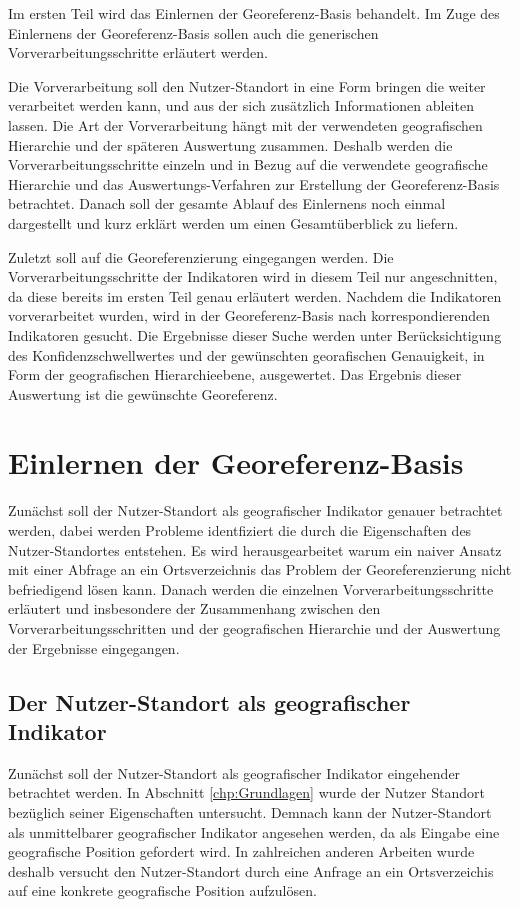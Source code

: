 	Im ersten Teil wird das Einlernen der Georeferenz-Basis behandelt.
	Im Zuge des Einlernens der Georeferenz-Basis sollen auch die generischen Vorverarbeitungsschritte erläutert werden.

	Die Vorverarbeitung soll den Nutzer-Standort in eine Form bringen die weiter verarbeitet werden kann, und aus der sich zusätzlich Informationen ableiten lassen.
	Die Art der Vorverarbeitung hängt mit der verwendeten geografischen Hierarchie und der späteren Auswertung zusammen.
	Deshalb werden die Vorverarbeitungsschritte einzeln und in Bezug auf die verwendete geografische Hierarchie und das Auswertungs-Verfahren zur Erstellung der Georeferenz-Basis betrachtet.
	Danach soll der gesamte Ablauf des Einlernens noch einmal dargestellt und kurz erklärt werden um einen Gesamtüberblick zu liefern.
	
	Zuletzt soll auf die Georeferenzierung eingegangen werden.
	Die Vorverarbeitungsschritte der Indikatoren wird in diesem Teil nur angeschnitten, da diese bereits im ersten Teil genau erläutert werden. 
	Nachdem die Indikatoren vorverarbeitet wurden, wird in der Georeferenz-Basis nach korrespondierenden Indikatoren gesucht. 
	Die Ergebnisse dieser Suche werden unter Berücksichtigung des Konfidenzschwellwertes und der gewünschten georafischen Genauigkeit, in Form der geografischen Hierarchieebene, ausgewertet.
	Das Ergebnis dieser Auswertung ist die gewünschte Georeferenz. 

	\section{Einlernen der Georeferenz-Basis}
	Zunächst soll der Nutzer-Standort als geografischer Indikator genauer betrachtet werden, dabei werden Probleme identfiziert die durch die Eigenschaften des Nutzer-Standortes entstehen.
	Es wird herausgearbeitet warum ein naiver Ansatz mit einer Abfrage an ein Ortsverzeichnis das Problem der Georeferenzierung nicht befriedigend lösen kann.  
	Danach werden die einzelnen Vorverarbeitungsschritte erläutert und insbesondere der Zusammenhang zwischen den Vorverarbeitungsschritten und der geografischen Hierarchie und der Auswertung der Ergebnisse eingegangen.   

			\subsection{Der Nutzer-Standort als geografischer Indikator}

			Zunächst soll der Nutzer-Standort als geografischer Indikator eingehender betrachtet werden. 
			In Abschnitt \ref{chp:Grundlagen} wurde der Nutzer Standort bezüglich seiner Eigenschaften untersucht. 
			Demnach kann der Nutzer-Standort als unmittelbarer geografischer Indikator angesehen werden, da als Eingabe eine geografische Position gefordert wird.  
			In zahlreichen anderen Arbeiten wurde deshalb versucht den Nutzer-Standort  durch eine Anfrage an ein Ortsverzeichis auf eine konkrete geografische Position aufzulösen.

